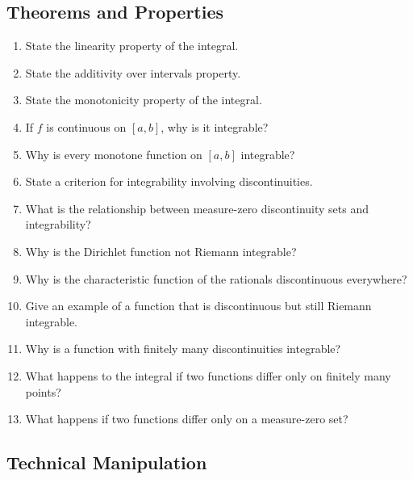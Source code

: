 \subsection{Theorems and Properties}

\begin{enumerate}[resume]
  \item State the linearity property of the integral.
  \item State the additivity over intervals property.
  \item State the monotonicity property of the integral.
  \item If \(f\) is continuous on \([a,b]\), why is it integrable?
  \item Why is every monotone function on \([a,b]\) integrable?
  \item State a criterion for integrability involving discontinuities.
  \item What is the relationship between measure-zero discontinuity sets and integrability?
  \item Why is the Dirichlet function not Riemann integrable?
  \item Why is the characteristic function of the rationals discontinuous everywhere?
  \item Give an example of a function that is discontinuous but still Riemann integrable.
  \item Why is a function with finitely many discontinuities integrable?
  \item What happens to the integral if two functions differ only on finitely many points?
  \item What happens if two functions differ only on a measure-zero set?
\end{enumerate}

\subsection{Technical Manipulation}

